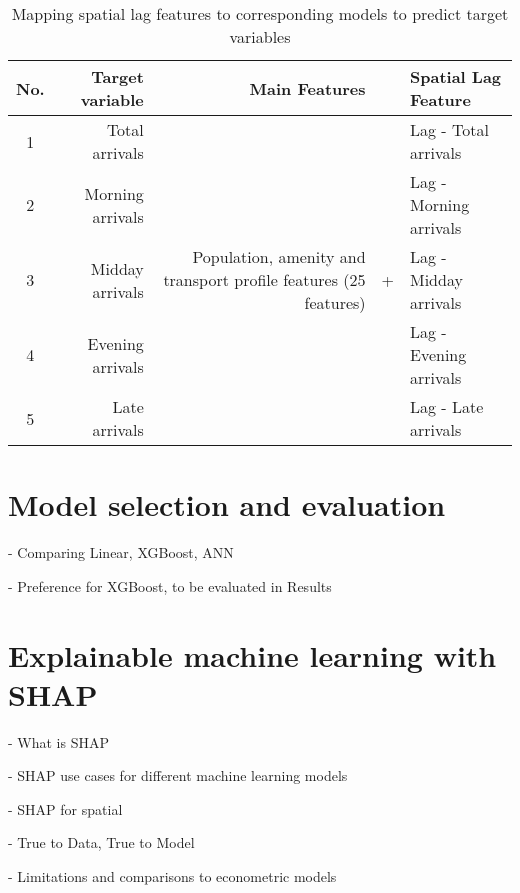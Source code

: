 \begin{table}[ht]
    \centering
    \renewcommand{\arraystretch}{1.5}
    \begin{tabular}{|c r || r c l|}
        \hline
        \rowcolor{lightgray}
        \textbf{No.} & \textbf{Target variable} & \textbf{Main Features} & &\textbf{Spatial Lag Feature}\\
        
        \hline
        1 & Total arrivals  &  \multirow{5}{12em}{Population, amenity and transport profile features (25 features)} 
                                &  \multirow{5}{*}{+}       &   Lag - Total arrivals    \\ 
        2 & Morning arrivals    &                       &   &   Lag - Morning arrivals  \\ 
        3 & Midday arrivals     &                       &   &   Lag - Midday arrivals   \\ 
        4 & Evening arrivals    &                       &   &   Lag - Evening arrivals  \\ 
        5 & Late arrivals       &                       &   &   Lag - Late arrivals     \\
        \hline
    \end{tabular}
    \caption{Mapping spatial lag features to corresponding models to predict target variables}
    \label{tab:spatiallag}
\end{table}




\pagebreak %
\section{Model selection and evaluation}
- Comparing Linear, XGBoost, ANN

- Preference for XGBoost, to be evaluated in Results

\section{Explainable machine learning with SHAP}
 - What is SHAP 
 
 - SHAP use cases for different machine learning models

 - SHAP for spatial

 - True to Data, True to Model

 - Limitations and comparisons to econometric models
